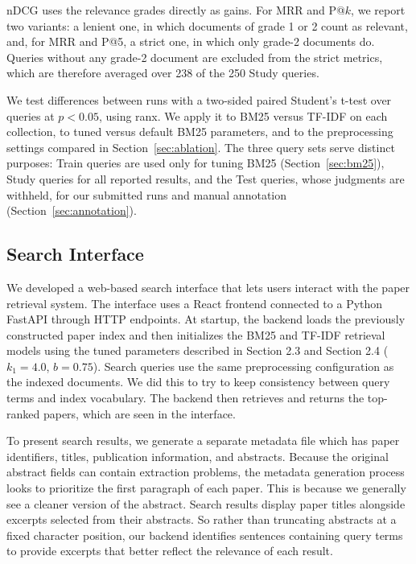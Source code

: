\documentclass[sigconf,nonacm]{acmart}
\begin{document}
nDCG uses the relevance grades directly as gains. For MRR and P@$k$, we
report two variants: a lenient one, in which documents of grade 1 or 2
count as relevant, and, for MRR and P@5, a strict one, in which only
grade-2 documents do. Queries without any grade-2 document are excluded
from the strict metrics, which are therefore averaged over 238 of the 250
Study queries.


We test differences between runs with a two-sided paired Student's
t-test over queries at $p < 0.05$, using ranx. We apply it to BM25
versus TF-IDF on each collection, to tuned versus default BM25
parameters, and to the preprocessing settings compared in
Section~\ref{sec:ablation}. The three query sets serve distinct
purposes: Train queries are used only for tuning BM25
(Section~\ref{sec:bm25}), Study queries for all reported results, and
the Test queries, whose judgments are withheld, for our submitted runs
and manual annotation (Section~\ref{sec:annotation}).


\subsection{Search Interface}
\label{sec:interface}
We developed a web-based search interface that lets users interact with the paper retrieval system. 
The interface uses a React frontend connected to a Python FastAPI through HTTP endpoints. 
At startup, the backend loads the previously constructed paper index and then initializes the 
BM25 and TF-IDF retrieval models using the tuned parameters described in Section 2.3 and Section 2.4 ($k_1 = 4.0$, $b = 0.75$). 
Search queries use the same preprocessing configuration as the indexed documents. 
We did this to try to keep consistency between query terms and index vocabulary. 
The backend then retrieves and returns the top-ranked papers, which are seen in the interface. 

To present search results, we generate a separate metadata file which has paper identifiers, 
titles, publication information, and abstracts. Because the original abstract fields can contain extraction problems, 
the metadata generation process looks to prioritize the first paragraph of each paper. This is because we generally 
see a cleaner version of the abstract. Search results display paper titles alongside excerpts selected from their abstracts. 
So rather than truncating abstracts at a fixed character position, our backend identifies sentences containing query terms 
to provide excerpts that better reflect the relevance of each result. 
\end{document}
